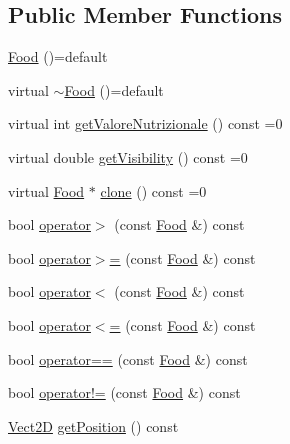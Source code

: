 \subsection*{Public Member Functions}
\begin{DoxyCompactItemize}
\item 
\hyperlink{classFood_a1c3ad8fc9b17466a7c47a978c7ce79c5_a1c3ad8fc9b17466a7c47a978c7ce79c5}{Food} ()=default
\item 
virtual \hyperlink{classFood_ae2a4e53388ef5377a6eb366dcdde3dd7_ae2a4e53388ef5377a6eb366dcdde3dd7}{$\sim$\+Food} ()=default
\item 
virtual int \hyperlink{classFood_a9bafe4a8c954c8e99395f25c19cc3eed_a9bafe4a8c954c8e99395f25c19cc3eed}{get\+Valore\+Nutrizionale} () const =0
\item 
virtual double \hyperlink{classFood_a81af14eff9dc5ce73dae309f04b20ccd_a81af14eff9dc5ce73dae309f04b20ccd}{get\+Visibility} () const =0
\item 
virtual \hyperlink{classFood}{Food} $\ast$ \hyperlink{classFood_a81ef8f27be431b43bfa244fde21ec90d_a81ef8f27be431b43bfa244fde21ec90d}{clone} () const =0
\item 
bool \hyperlink{classFood_a63e0188fe0464bc533d800d8cdb17984_a63e0188fe0464bc533d800d8cdb17984}{operator$>$} (const \hyperlink{classFood}{Food} \&) const
\item 
bool \hyperlink{classFood_a8f2ac4d8b5434d35947b038390fab95d_a8f2ac4d8b5434d35947b038390fab95d}{operator$>$=} (const \hyperlink{classFood}{Food} \&) const
\item 
bool \hyperlink{classFood_ac0c1ef5c9608080ae7e0bbb6375f92ce_ac0c1ef5c9608080ae7e0bbb6375f92ce}{operator$<$} (const \hyperlink{classFood}{Food} \&) const
\item 
bool \hyperlink{classFood_a69f902e1e0268b3ad9d99f7a46ab3ae5_a69f902e1e0268b3ad9d99f7a46ab3ae5}{operator$<$=} (const \hyperlink{classFood}{Food} \&) const
\item 
bool \hyperlink{classFood_afaba8cd54420aecea26a207f0fd0251a_afaba8cd54420aecea26a207f0fd0251a}{operator==} (const \hyperlink{classFood}{Food} \&) const
\item 
bool \hyperlink{classFood_abf50e88ce6cc0db8c43dfb42d2978b01_abf50e88ce6cc0db8c43dfb42d2978b01}{operator!=} (const \hyperlink{classFood}{Food} \&) const
\item 
\hyperlink{classVect2D}{Vect2D} \hyperlink{classCartesianObject2D_aa3a6b63777852ab9eb9408ed2536abe2_aa3a6b63777852ab9eb9408ed2536abe2}{get\+Position} () const
\end{DoxyCompactItemize}

